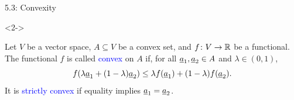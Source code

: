 \documentclass[10pt,letterpaper,english]{beamer}
\begin{document}
\begin{frame}{5.3: Convexity}
\begin{definition}<2->
\begin{minipage}{0.70\textwidth}
Let $V$ be a vector space, $A \subseteq V$ be a convex set, and $f \colon V \rightarrow \mathbb{R}$ be a functional.
The functional $f$ is called \textcolor{blue}{convex} on $A$ if, for all $\underline{a}_1,\underline{a}_2 \in A$ and $\lambda\in(0,1)$, \vspace{-1mm}
\[ f( \lambda \vecnot{a}_1 + (1-\lambda) \vecnot{a}_2 ) \leq \lambda f( \vecnot{a}_1 ) + (1-\lambda) f ( \vecnot{a}_2 ). \vspace{-1mm} \]
It is \textcolor{blue}{strictly convex} if equality implies $\underline{a}_1 = \underline{a}_2$.
\end{minipage}\hspace{-3mm}
\begin{minipage}{0.29\textwidth}
\end{minipage}
\end{definition}

\end{frame}
\end{document}
